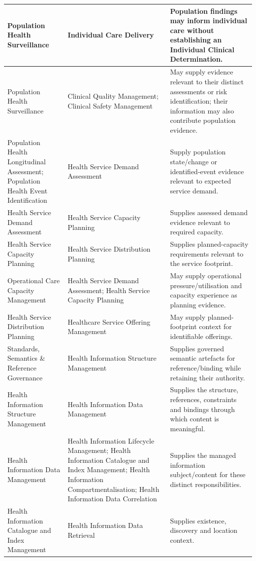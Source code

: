 \begin{longtable}{|>{\raggedright\arraybackslash}p{0.24\TableWidth}|>{\raggedright\arraybackslash}p{0.33\TableWidth}|>{\raggedright\arraybackslash}p{0.43\TableWidth}|}
Population Health Surveillance & Individual Care Delivery & Population findings may inform individual care without establishing an Individual Clinical Determination.\\\hline
Population Health Surveillance & Clinical Quality Management; Clinical Safety Management & May supply evidence relevant to their distinct assessments or risk identification; their information may also contribute population evidence.\\\hline
Population Health Longitudinal Assessment; Population Health Event Identification & Health Service Demand Assessment & Supply population state/\allowbreak{}change or identified-event evidence relevant to expected service demand.\\\hline
Health Service Demand Assessment & Health Service Capacity Planning & Supplies assessed demand evidence relevant to required capacity.\\\hline
Health Service Capacity Planning & Health Service Distribution Planning & Supplies planned-capacity requirements relevant to the service footprint.\\\hline
Operational Care Capacity Management & Health Service Demand Assessment; Health Service Capacity Planning & May supply operational pressure/\allowbreak{}utilisation and capacity experience as planning evidence.\\\hline
Health Service Distribution Planning & Healthcare Service Offering Management & May supply planned-footprint context for identifiable offerings.\\\hline
Standards, Semantics \& Reference Governance & Health Information Structure Management & Supplies governed semantic artefacts for reference/\allowbreak{}binding while retaining their authority.\\\hline
Health Information Structure Management & Health Information Data Management & Supplies the structure, references, constraints and bindings through which content is meaningful.\\\hline
Health Information Data Management & Health Information Lifecycle Management; Health Information Catalogue and Index Management; Health Information Compartmentalisation; Health Information Data Correlation & Supplies the managed information subject/\allowbreak{}content for these distinct responsibilities.\\\hline
Health Information Catalogue and Index Management & Health Information Data Retrieval & Supplies existence, discovery and location context.\\\hline

\end{longtable}
